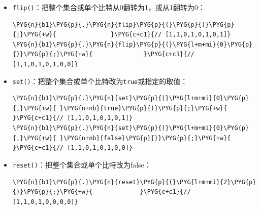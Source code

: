 \begin{itemize}

\item \texttt{flip()}：把整个集合或单个比特从0翻转为1，或从1翻转为0：



\begin{codeblockbg}
\begin{Verbatim}[commandchars=\\\{\},breaklines=true,breakanywhere=true,fontsize=\codefont,xleftmargin=17bp]
\PYG{n}{b1}\PYG{p}{.}\PYG{n}{flip}\PYG{p}{(}\PYG{p}{)}\PYG{p}{;}\PYG{+w}{               }\PYG{c+c1}{// [1,1,0,1,0,1,0,1]}
\PYG{n}{b1}\PYG{p}{.}\PYG{n}{flip}\PYG{p}{(}\PYG{l+m+mi}{0}\PYG{p}{)}\PYG{p}{;}\PYG{+w}{              }\PYG{c+c1}{// [1,1,0,1,0,1,0,0]}
\end{Verbatim}
\end{codeblockbg}



\item \texttt{set()}：把整个集合或单个比特改为\texttt{true}或指定的取值：



\begin{codeblockbg}
\begin{Verbatim}[commandchars=\\\{\},breaklines=true,breakanywhere=true,fontsize=\codefont,xleftmargin=17bp]
\PYG{n}{b1}\PYG{p}{.}\PYG{n}{set}\PYG{p}{(}\PYG{l+m+mi}{0}\PYG{p}{,}\PYG{+w}{ }\PYG{n+nb}{true}\PYG{p}{)}\PYG{p}{;}\PYG{+w}{         }\PYG{c+c1}{// [1,1,0,1,0,1,0,1]}
\PYG{n}{b1}\PYG{p}{.}\PYG{n}{set}\PYG{p}{(}\PYG{l+m+mi}{0}\PYG{p}{,}\PYG{+w}{ }\PYG{n+nb}{false}\PYG{p}{)}\PYG{p}{;}\PYG{+w}{        }\PYG{c+c1}{// [1,1,0,1,0,1,0,0]}
\end{Verbatim}
\end{codeblockbg}



\item \texttt{reset()}：把整个集合或单个比特改为false：



\begin{codeblockbg}
\begin{Verbatim}[commandchars=\\\{\},breaklines=true,breakanywhere=true,fontsize=\codefont,xleftmargin=17bp]
\PYG{n}{b1}\PYG{p}{.}\PYG{n}{reset}\PYG{p}{(}\PYG{l+m+mi}{2}\PYG{p}{)}\PYG{p}{;}\PYG{+w}{             }\PYG{c+c1}{// [1,1,0,1,0,0,0,0]}
\end{Verbatim}
\end{codeblockbg}

\end{itemize}



